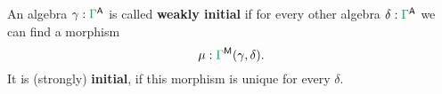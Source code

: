 \begin{defn}
An algebra $\gamma : \grm{\Gamma}^\CC$ is called \textbf{weakly initial} if
for every other algebra $\delta : \grm{\Gamma}^\CC$ we can find a morphism
\begin{equation*}
\mu : \grm{\Gamma}^\MM(\gamma, \delta) \text{.}
\end{equation*}
It is (strongly) \textbf{initial}, if this morphism is unique for every $\delta$.
\end{defn}















